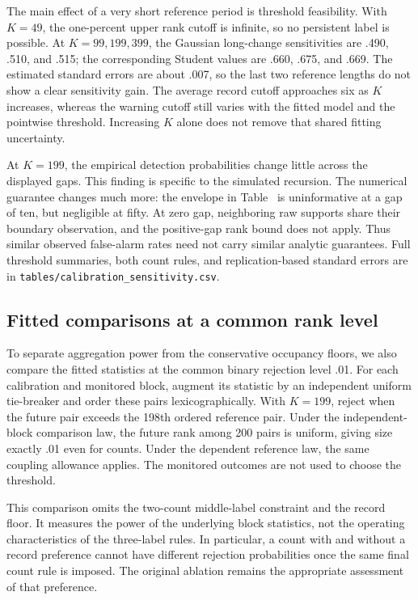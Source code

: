 \documentclass[11pt]{article}
\makeatletter
\DeclareRobustCommand{\MainRef}[2]{\hyper@linkfile{#2}{main.pdf}{#1}}
\theoremstyle{definition}
\theoremstyle{remark}
\newcommand{\1}{\mathbf 1}
\makeatother
\begin{document}
The main effect of a very short reference period is threshold feasibility. With \(K=49\), the one-percent upper rank cutoff is infinite, so no persistent label is possible. At \(K=99,199,399\), the Gaussian long-change sensitivities are .490, .510, and .515; the corresponding Student values are .660, .675, and .669. The estimated standard errors are about .007, so the last two reference lengths do not show a clear sensitivity gain. The average record cutoff approaches six as \(K\) increases, whereas the warning cutoff still varies with the fitted model and the pointwise threshold. Increasing \(K\) alone does not remove that shared fitting uncertainty.

At \(K=199\), the empirical detection probabilities change little across the displayed gaps. This finding is specific to the simulated recursion. The numerical guarantee changes much more: the envelope in Table~\MainRef{table.caption.2}{1} is uninformative at a gap of ten, but negligible at fifty. At zero gap, neighboring raw supports share their boundary observation, and the positive-gap rank bound does not apply. Thus similar observed false-alarm rates need not carry similar analytic guarantees. Full threshold summaries, both count rules, and replication-based standard errors are in \texttt{tables/calibration\_sensitivity.csv}.

\FloatBarrier
\subsection{Fitted comparisons at a common rank level}\label{subsec:fittedmatched}\hypertarget{app:fittedmatched}{}

To separate aggregation power from the conservative occupancy floors, we also compare the fitted statistics at the common binary rejection level .01. For each calibration and monitored block, augment its statistic by an independent uniform tie-breaker and order these pairs lexicographically. With \(K=199\), reject when the future pair exceeds the 198th ordered reference pair. Under the independent-block comparison law, the future rank among 200 pairs is uniform, giving size exactly .01 even for counts. Under the dependent reference law, the same coupling allowance applies. The monitored outcomes are not used to choose the threshold.

This comparison omits the two-count middle-label constraint and the record floor. It measures the power of the underlying block statistics, not the operating characteristics of the three-label rules. In particular, a count with and without a record preference cannot have different rejection probabilities once the same final count rule is imposed. The original ablation remains the appropriate assessment of that preference.
\end{document}
